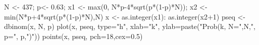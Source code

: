 \begin{Schunk}
\begin{Sinput}
 N <- 437; p<- 0.63; x1 <- max(0, N*p-4*sqrt(p*(1-p)*N)); x2 <- min(N*p+4*sqrt(p*(1-p)*N),N)
 x <- as.integer(x1): as.integer(x2+1)
 pseq <- dbinom(x, N, p)
 plot(x, pseq, type="h", xlab="k", ylab=paste("Prob(k, N=",N,", p=", p,")"))
 points(x, pseq, pch=18,cex=0.5)
\end{Sinput}
\end{Schunk}

